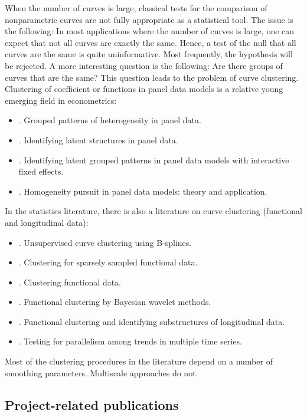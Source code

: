 \documentclass[a4paper,12pt]{article}
\begin{document}
\noindent When the number of curves is large, classical tests for the comparison of nonparametric curves are not fully appropriate as a statistical tool. The issue is the following: In most applications where the number of curves is large, one can expect that not all curves are exactly the same. Hence, a test of the null that all curves are the same is quite uninformative. Most frequently, the hypothesis will be rejected. A more interesting question is the following: Are there groups of curves that are the same? This question leads to the problem of curve clustering. Clustering of coefficient or functions in panel data models is a relative young emerging field in econometrics: 
\begin{itemize}[label=--,leftmargin=0.5cm]
\item \cite{Bonhomme2015}. Grouped patterns of heterogeneity in panel data.
\item \cite*{Su2016}. Identifying latent structures in panel data.
\item \cite{Su2018}. Identifying latent grouped patterns in panel data models with
interactive fixed effects.
\item \cite{Wang2018}. Homogeneity pursuit in panel data models: theory and application.
\end{itemize}
In the statistics literature, there is also a literature on curve clustering (functional and longitudinal data): 
\begin{itemize}[label=--,leftmargin=0.5cm]
\item \cite*{Abraham2003}. Unsupervised curve clustering using B-splines.
\item \cite{James2003}. Clustering for sparsely sampled functional data.
\item \cite*{Tarpey2003}. Clustering functional data.
\item \cite*{Ray2006}. Functional clustering by Bayesian wavelet methods.
\item \cite{Chiou2007}. Functional clustering and identifying substructures of longitudinal data.
\item \cite*{DegrasWu2012}. Testing for parallelism among trends in multiple time series.
\end{itemize}
Most of the clustering procedures in the literature depend on a number of smoothing parameters. Multiscale approaches do not. 



\subsection{Project-related publications}
\end{document}
